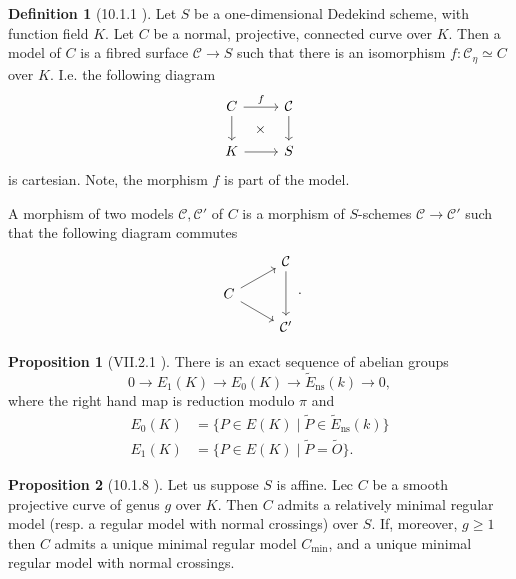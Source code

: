 \documentclass[a4paper]{report}
\theoremstyle{definition}
\newtheorem*{definition}{Definition}
\newtheorem*{proposition}{Proposition}
\begin{document}
\begin{definition}[10.1.1 \cite{liu}]
	Let $S$ be a one-dimensional Dedekind scheme, with function field $K$.  
	Let $C$ be a normal, projective, connected curve over $K$. 
	Then a model of  $C$ is a fibred surface $\mathcal{C}  \to S$ such that there is an isomorphism $f: \mathcal{C} _\eta \simeq C$ over $K$. 
	I.e. the following diagram \[
	\begin{tikzcd}
		C \rar{f} \dar \ar[phantom]{dr}{\times }& \mathcal{C}  \dar \\
		K \rar & S
	\end{tikzcd}
	\] 
	is cartesian. 
	Note, the morphism $f$ is part of the model. 

	A morphism of two models $\mathcal{C} , \mathcal{C} '$ of $C$ is a morphism of $S$-schemes $\mathcal{C}  \to \mathcal{C} '$ such that the following diagram commutes
	\[
	\begin{tikzcd}[row sep =small ]
		& \mathcal{C}  \ar{dd} \\
		C \ar{ur} \ar{dr} \\
		& \mathcal{C} '
	\end{tikzcd}
	.\] 
\end{definition}

\begin{proposition}
	[VII.2.1 \cite{silvermanarithmetic}]
	There is an exact sequence of abelian groups \[
		0 \to E_1(K) \to E_0(K) \to \tilde E_\text{ns} (k) \to 0
	,\] 
	where  the right hand map is reduction modulo $\pi$ and 
	\begin{align*}
		E_0(K ) &= \{P \in E(K) \mid \tilde  P \in \tilde E_\text{ns} (k)\}\\
		E_1(K) &= \{P \in E(K)  \mid \tilde P = \tilde O\}  
	.\end{align*}
\end{proposition}

\begin{proposition}
	[10.1.8 \cite{liu}]
	Let us suppose $S $ is affine. Lec $C$ be a smooth projective curve of genus $g$ over $K$. 
	Then $C$ admits a relatively  minimal regular model (resp. a regular model with normal crossings) over  $S$. 
	If, moreover, $g \ge 1$ then $C$ admits a unique minimal regular model $C_\text{min}$, and a unique minimal regular model with normal crossings. 
\end{proposition}
\end{document}
